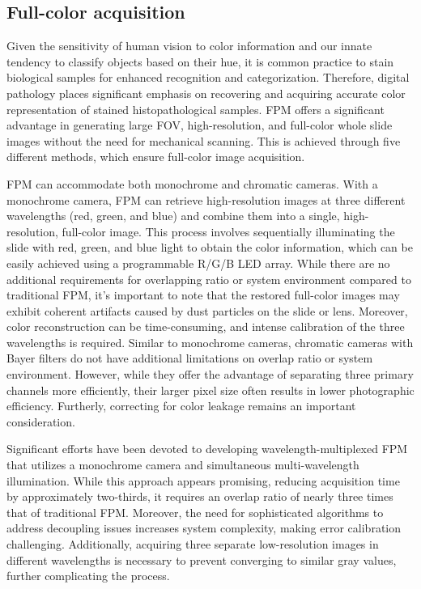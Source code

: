 \documentclass[journal,review,submit,pdftex,moreauthors]{Definitions/mdpi}
\begin{document}
\subsection{Full-color acquisition}
Given the sensitivity of human vision to color information and our innate tendency to classify objects based on their hue, it is common practice to stain biological samples for enhanced recognition and categorization. Therefore, digital pathology places significant emphasis on recovering and acquiring accurate color representation of stained histopathological samples. FPM offers a significant advantage in generating large FOV, high-resolution, and full-color whole slide images without the need for mechanical scanning. This is achieved through five different methods, which ensure full-color image acquisition.

FPM can accommodate both monochrome and chromatic cameras. With a monochrome camera, FPM can retrieve high-resolution images at three different wavelengths (red, green, and blue) and combine them into a single, high-resolution, full-color image. This process involves sequentially illuminating the slide with red, green, and blue light to obtain the color information, which can be easily achieved using a programmable R/G/B LED array. While there are no additional requirements for overlapping ratio or system environment compared to traditional FPM, it's important to note that the restored full-color images may exhibit coherent artifacts caused by dust particles on the slide or lens. Moreover, color reconstruction can be time-consuming, and intense calibration of the three wavelengths is required. Similar to monochrome cameras, chromatic cameras with Bayer filters do not have additional limitations on overlap ratio or system environment. However, while they offer the advantage of separating three primary channels more efficiently, their larger pixel size often results in lower photographic efficiency. Furtherly, correcting for color leakage remains an important consideration\cite{zhou2017fourier}.

Significant efforts have been devoted to developing wavelength-multiplexed FPM that utilizes a monochrome camera and simultaneous multi-wavelength illumination\cite{dong2014spectral,zhou2017fourier,pan2016incoherent,sun2016sampling,wang2017color}. While this approach appears promising, reducing acquisition time by approximately two-thirds, it requires an overlap ratio of nearly three times that of traditional FPM\cite{sun2016sampling}. Moreover, the need for sophisticated algorithms to address decoupling issues increases system complexity, making error calibration challenging. Additionally, acquiring three separate low-resolution images in different wavelengths is necessary to prevent converging to similar gray values, further complicating the process\cite{sun2016sampling,wang2017color}.
\end{document}
